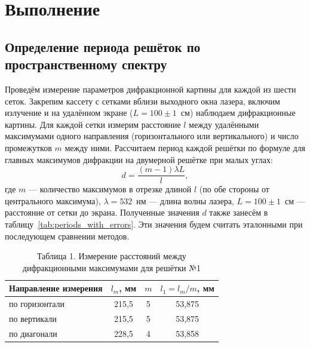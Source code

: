 \documentclass[a4paper]{article}
\begin{document}
\section{Выполнение}

\subsection{Определение периода решёток по пространственному спектру}

Проведём измерение параметров дифракционной картины для каждой из шести сеток. Закрепим кассету с сетками вблизи выходного окна лазера, включим излучение и на удалённом экране ($L = 100 \pm 1$~см) наблюдаем дифракционные картины. Для каждой сетки измерим расстояние $l$ между удалёнными максимумами одного направления (горизонтального или вертикального) и число промежутков $m$ между ними. Рассчитаем период каждой решётки по формуле для главных максимумов дифракции на двумерной решётке при малых углах:
\begin{equation}
    d = \frac{(m-1) \lambda L}{l},
    \label{eq:d_spectrum}
\end{equation}
где $m $ --- количество максимумов в отрезке длиной $l$ (по обе стороны от центрального максимума), $\lambda = 532$~нм --- длина волны лазера, $L = 100\pm1$~см --- расстояние от сетки до экрана. Полученные значения $d$ также занесём в таблицу~\ref{tab:periods_with_errors}. Эти значения будем считать эталонными при последующем сравнении методов.

\begin{table}[h!]
\centering
\begin{tabular}{|l|c|c|c|}
\hline
Направление измерения & $l_m$, мм & $m$ & $l_1 = l_m/m$, мм \\
\hline
по горизонтали & 215,5 & 5 & 53,875 \\
\hline
по вертикали & 215,5 & 5 & 53,875 \\
\hline
по диагонали & 228,5 & 4 & 53,858 \\
\hline
\end{tabular}
\caption{Таблица 1. Измерение расстояний между дифракционными максимумами для решётки №1}
\label{tab:grid1_directions}
\end{table}
\end{document}
